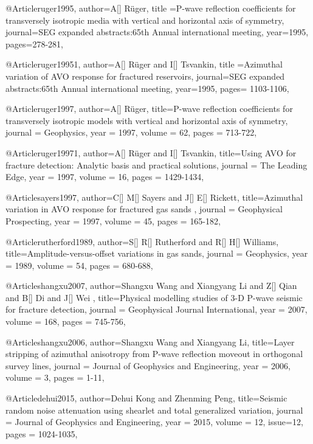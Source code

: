 @Article{ruger1995,
  author={A[] R\"{u}ger},
  title ={P-wave reflection coefficients for transversely isotropic media with vertical and horizontal axis of symmetry},
  journal={SEG expanded abstracts:65th Annual international meeting},
  year=1995,
  pages={278-281},
}


@Article{ruger19951,
  author={A[] R\"{u}ger and I[] Tsvankin},
  title ={Azimuthal variation of AVO response for fractured reservoirs},
  journal={SEG expanded abstracts:65th Annual international meeting},
  year=1995,
  pages={ 1103-1106},
}

@Article{ruger1997,
  author={A[] R\"{u}ger},
  title={P-wave reflection coefficients for transversely isotropic models with vertical and horizontal axis of symmetry},
  journal = 	 {Geophysics},
  year = 	 1997,
  volume =	 62,
  pages =	 {713-722},
}

@Article{ruger19971,
  author={A[] R\"{u}ger and I[] Tsvankin},
  title={Using AVO for fracture detection: Analytic basis and practical solutions},
  journal = 	 {The Leading Edge},
  year = 	 1997,
  volume =	16,
  pages =	 {1429-1434},
}


@Article{sayers1997,
  author={C[] M[] Sayers and J[] E[] Rickett},
  title={Azimuthal variation in AVO response for fractured gas sands
},
  journal = 	 {Geophysical Prospecting},
  year = 	 1997,
  volume =	45,
  pages =	 {165-182},
}

@Article{rutherford1989,
  author={S[] R[] Rutherford and R[] H[] Williams},
  title={Amplitude-versus-offset variations in gas sands},
  journal = 	 {Geophysics},
  year = 	 1989,
  volume =	54,
  pages =	 {680-688},
}

@Article{shangxu2007,
  author={Shangxu Wang and Xiangyang Li and Z[] Qian and B[] Di and J[] Wei },
  title={Physical modelling studies of 3-D P-wave seismic for fracture detection},
  journal = 	 {Geophysical Journal International},
  year = 	 2007,
  volume =	 168,
  pages =	 {745-756},
}

@Article{shangxu2006,
  author={Shangxu Wang and Xiangyang Li},
  title={Layer stripping of azimuthal anisotropy from P-wave reflection moveout in orthogonal survey lines},
  journal = 	 {Journal of Geophysics and Engineering},
  year = 	 2006,
  volume =	 3,
  pages =	 {1-11},
}

@Article{dehui2015,
  author={Dehui Kong and Zhenming Peng},
  title={Seismic random noise attenuation using shearlet and total generalized variation},
  journal = 	 {Journal of Geophysics and Engineering},
  year = 	 2015,
  volume =	 12,
  issue=12,
  pages =	 {1024-1035},
}

